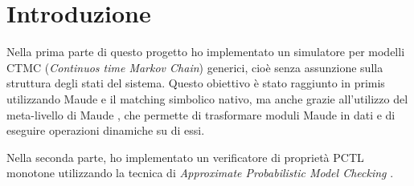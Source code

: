 \section{Introduzione}

Nella prima parte di questo progetto ho implementato un simulatore per modelli
CTMC (\emph{Continuos time Markov Chain}) generici, cioè senza assunzione sulla
struttura degli stati del sistema. Questo obiettivo è stato raggiunto in
primis utilizzando Maude e il matching simbolico nativo, ma anche
grazie all'utilizzo del meta-livello di Maude \cite{maudemanual}, che permette
di trasformare moduli Maude in dati e di eseguire operazioni dinamiche su di essi.

Nella seconda parte, ho implementato un verificatore di proprietà
PCTL monotone utilizzando la tecnica di \emph{Approximate Probabilistic Model
Checking} \cite{DBLP:conf/vmcai/2004}\cite{HLMP04}.
